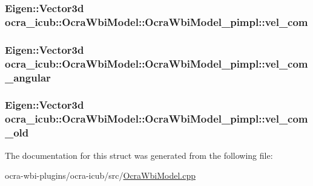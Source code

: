 \hypertarget{structOcraWbiModel_1_1OcraWbiModel__pimpl_a96c3cdb51b2a2b69c0738605c30e1b2e}{
\subsubsection[{vel\-\_\-com}]{\setlength{\rightskip}{0pt plus 5cm}\-Eigen\-::\-Vector3d {\bf ocra\-\_\-icub\-::\-Ocra\-Wbi\-Model\-::\-Ocra\-Wbi\-Model\-\_\-pimpl\-::vel\-\_\-com}}}\label{structOcraWbiModel_1_1OcraWbiModel__pimpl_a96c3cdb51b2a2b69c0738605c30e1b2e}
\hypertarget{structOcraWbiModel_1_1OcraWbiModel__pimpl_a696d73e62837978589a2730c8feb325c}{
\subsubsection[{vel\-\_\-com\-\_\-angular}]{\setlength{\rightskip}{0pt plus 5cm}\-Eigen\-::\-Vector3d {\bf ocra\-\_\-icub\-::\-Ocra\-Wbi\-Model\-::\-Ocra\-Wbi\-Model\-\_\-pimpl\-::vel\-\_\-com\-\_\-angular}}}\label{structOcraWbiModel_1_1OcraWbiModel__pimpl_a696d73e62837978589a2730c8feb325c}
\hypertarget{structOcraWbiModel_1_1OcraWbiModel__pimpl_a374d6086cdcd96ee792ca62288adb178}{
\subsubsection[{vel\-\_\-com\-\_\-old}]{\setlength{\rightskip}{0pt plus 5cm}\-Eigen\-::\-Vector3d {\bf ocra\-\_\-icub\-::\-Ocra\-Wbi\-Model\-::\-Ocra\-Wbi\-Model\-\_\-pimpl\-::vel\-\_\-com\-\_\-old}}}\label{structOcraWbiModel_1_1OcraWbiModel__pimpl_a374d6086cdcd96ee792ca62288adb178}


\-The documentation for this struct was generated from the following file\-:\begin{DoxyCompactItemize}
\item 
ocra-\/wbi-\/plugins/ocra-\/icub/src/\hyperlink{OcraWbiModel_8cpp}{\-Ocra\-Wbi\-Model.\-cpp}\end{DoxyCompactItemize}
